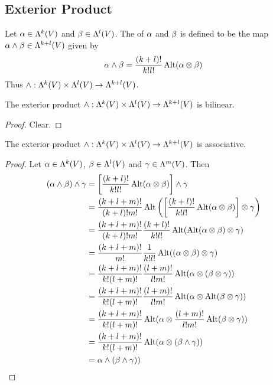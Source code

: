 \documentclass{book}
\begin{document}
	
	
	
	
	
	
	
	
	
	
	
	
	
	
	
	
	
	
	
	
	\subsection{Exterior Product}
	
	\begin{defn}
		Let $\alpha \in \Lambda^k(V)$ and $\beta \in \Lambda^l(V)$. The  of $\alpha$ and $\beta$ is defined to be the map $\alpha \wedge \beta \in \Lambda^{k+l}(V)$ given by $$\alpha \wedge \beta = \frac{(k+l)!}{k! l!} \operatorname{Alt}(\alpha \otimes \beta)$$ 
		Thus $\wedge: \Lambda^k(V) \times \Lambda^l(V) \rightarrow \Lambda^{k+l}(V)$.
	\end{defn}

	\begin{ex}
		The exterior product $\wedge: \Lambda^k(V) \times \Lambda^l(V) \rightarrow \Lambda^{k+l}(V)$ is bilinear.
	\end{ex}
	
	\begin{proof}
		Clear.
	\end{proof}

	\begin{ex}
		The exterior product $\wedge: \Lambda^k(V) \times \Lambda^l(V) \rightarrow \Lambda^{k+l}(V)$ is associative. 
	\end{ex}

	\begin{proof}
		Let $\alpha \in \Lambda^k(V)$, $\beta \in \Lambda^l(V)$ and $\gamma \in \Lambda^m(V)$. Then 
		\begin{align*}
			(\alpha \wedge \beta) \wedge \gamma
			& = \bigg [ \frac{(k+l)!}{k! l!} \operatorname{Alt}(\alpha \otimes \beta) \bigg] \wedge \gamma \\ 
			& = \frac{(k+l+m)!}{(k+l)!m!} \operatorname{Alt} \bigg( \bigg [ \frac{(k+l)!}{k! l!} \operatorname{Alt}(\alpha \otimes \beta) \bigg] \otimes \gamma \bigg)  \\ 
			& = \frac{(k+l+m)!}{(k+l)!m!}  \frac{(k+l)!}{k!l!}\operatorname{Alt}(\operatorname{Alt}(\alpha \otimes \beta) \otimes \gamma) \\
			& = \frac{(k+l+m)!}{m!}  \frac{1}{k!l!} \operatorname{Alt}((\alpha \otimes \beta) \otimes \gamma) \\
			& = \frac{(k+l+m)!}{k!(l+m)!}  \frac{(l+m)!}{l!m!} \operatorname{Alt}(\alpha \otimes (\beta \otimes \gamma)) \\
			& = \frac{(k+l+m)!}{k!(l+m)!}  \frac{(l+m)!}{l!m!} \operatorname{Alt}(\alpha \otimes \operatorname{Alt}(\beta \otimes \gamma)) \\
			& = \frac{(k+l+m)!}{k!(l+m)!} \operatorname{Alt}(\alpha \otimes \frac{(l+m)!}{l!m!} \operatorname{Alt}(\beta \otimes \gamma)) \\
			& = \frac{(k+l+m)!}{k!(l+m)!} \operatorname{Alt}(\alpha \otimes (\beta \wedge \gamma)) \\
			& = \alpha \wedge (\beta \wedge \gamma)) \\
		\end{align*}
	\end{proof}
	
\end{document}

